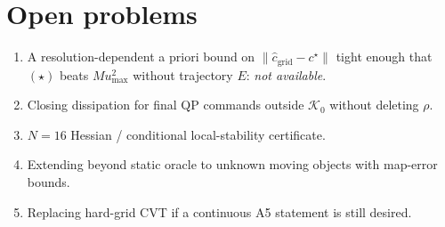 \documentclass[11pt]{article}
\newcommand{\umax}{u_{\max}}
\begin{document}
\section{Open problems}
\begin{enumerate}
\item A resolution-dependent a priori bound on $\|\hat c_{\mathrm{grid}}-c^\star\|$
tight enough that $(\star)$ beats $M\umax^2$ without trajectory $E$: \emph{not
available}.
\item Closing dissipation for final QP commands outside $\mathcal{K}_0$ without
deleting $\rho$.
\item $N=16$ Hessian / conditional local-stability certificate.
\item Extending beyond static oracle to unknown moving objects with map-error
bounds.
\item Replacing hard-grid CVT if a continuous A5 statement is still desired.
\end{enumerate}

\appendix

\end{document}
